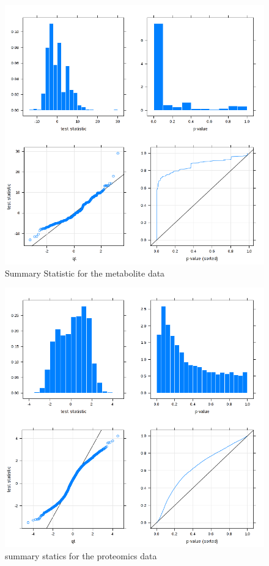 \documentclass[a4paper,11pt,twoside]{book}
\begin{document}
\begin{subappendices}
\begin{figure}[ht]
	\includegraphics[width=0.8\linewidth]{Appendix_FIgures/metabotes.png}
	\caption{Summary Statistic for the metabolite data}
\end{figure}
\clearpage

\begin{figure}[ht]
	\includegraphics[width=0.8\linewidth]{Appendix_FIgures/power_stat_3_dpi72.png}
	\caption{summary statics for the proteomics data}
\end{figure}
\clearpage


\end{subappendices}
\end{document}
